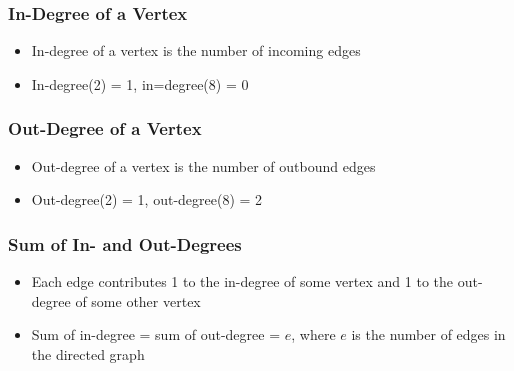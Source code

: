 \documentclass[newPxFont,sthlmFooter,nooffset]{beamer}
\begin{document}
\begin{frame}[t]
  \frametitle{In-Degree of a Vertex}
  \begin{itemize}
  \item In-degree of a vertex is the number of incoming edges
  \item In-degree(2) = 1, in=degree(8) = 0
  \end{itemize}
  \begin{center}
  \end{center}

\end{frame}

\begin{frame}[t]
  \frametitle{Out-Degree of a Vertex}
  \begin{itemize}
  \item Out-degree of a vertex is the number of outbound edges
  \item Out-degree(2) = 1, out-degree(8) = 2
  \end{itemize}
  \begin{center}
  \end{center}

\end{frame}


\begin{frame}[t]
  \frametitle{Sum of In- and Out-Degrees}
  \begin{itemize}
  \item Each edge contributes 1 to the in-degree of some vertex and 1 to the out-degree of some other vertex
  \item Sum of in-degree = sum of out-degree = $e$, where $e$ is the number of edges in the directed graph
  \end{itemize}
\end{frame}
\end{document}
